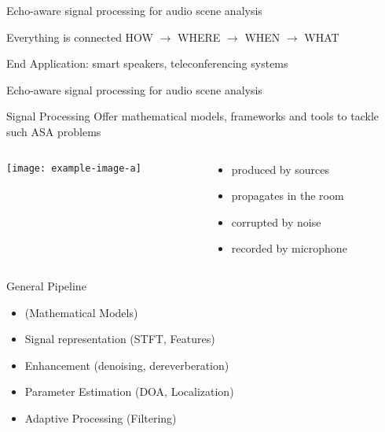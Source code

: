\begin{frame}[t]{Echo-aware signal processing for \alert{audio scene analysis}}

    \begin{block}{Everything is connected}
        HOW  $\rightarrow$ WHERE $\rightarrow$ WHEN $\rightarrow$ WHAT
    \end{block}

    End Application: smart speakers, teleconferencing systems
\end{frame}


\begin{frame}{Echo-aware \alert{signal processing} for audio scene analysis}

    \begin{mydefblock}{Signal Processing}
        Offer mathematical models, frameworks and tools to tackle such ASA problems
    \end{mydefblock}

    \vfill
    \begin{columns}
        \begin{column}{0.45\textwidth}
            \centering
            \texttt{[image: example-image-a]}
        \end{column}
        \begin{column}{0.58\textwidth}
            \begin{itemize}
                \item<1-> produced by sources
                \item<2-> propagates in the room
                \item<3-> corrupted by noise
                \item<4-> recorded by microphone
            \end{itemize}
        \end{column}
    \end{columns}

    \vfill
    \begin{block}{General Pipeline}
        \begin{itemize}
            \item (Mathematical Models)
            \item Signal representation (STFT, Features)
            \item Enhancement (denoising, dereverberation)
            \item Parameter Estimation (DOA, Localization)
            \item Adaptive Processing (Filtering)
        \end{itemize}
    \end{block}

\end{frame}

